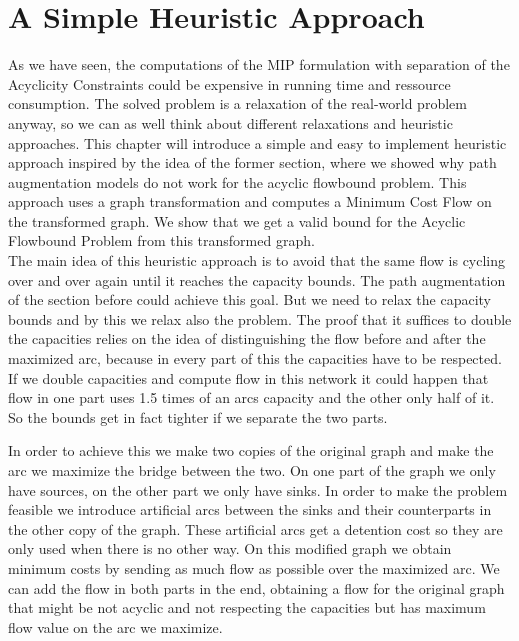 \newpage
\section{A Simple Heuristic Approach}

As we have seen, the computations of the MIP formulation with separation of the Acyclicity Constraints could be 
expensive in running time and ressource consumption. The solved problem is a relaxation of the real-world 
problem anyway, so we can as well think 
about different relaxations and heuristic approaches. This chapter will introduce a simple and easy to 
implement heuristic approach inspired by the idea of the former section, where we showed why path augmentation models 
do not work for the acyclic flowbound problem. This approach uses a graph transformation and computes a Minimum Cost 
Flow on the transformed graph. We show that we get a valid bound for the Acyclic Flowbound Problem from this 
transformed graph.\\

The main idea of this heuristic approach is to avoid that the same flow is cycling over and over again until it reaches 
the capacity bounds. The path augmentation of the section before could achieve this goal. But we need to relax the 
capacity bounds and by this we relax also the problem. The proof that it suffices to double the capacities relies on 
the idea of distinguishing the flow before and after the maximized arc, because in every part of this the capacities 
have to be respected. If we double capacities and compute flow in this network it could happen that flow in one part 
uses 1.5 times of an arcs capacity and the other only half of it. So the bounds get in fact tighter if we separate the 
two parts.

In order to achieve this we make two copies of the original graph and make the arc we maximize the 
bridge between the two. On one part of the graph we only have sources, on the other part we only have sinks. 
In order to make the problem feasible we introduce artificial arcs between the sinks and their counterparts in the other 
copy of the graph. These artificial arcs get a detention cost so they are only used when there is no other way. On this 
modified graph we obtain minimum costs by sending as much flow as possible over the maximized arc. We can add the flow 
in both parts in the end, obtaining a flow for the original graph that might be not acyclic and not respecting the 
capacities but has maximum flow value on the arc we maximize. 

